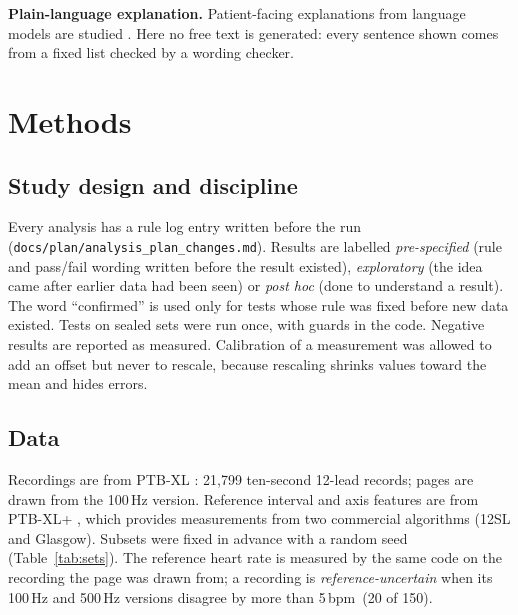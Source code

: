 \documentclass[11pt,a4paper]{article}
\newcommand{\bpm}{\,bpm}
\begin{document}
\textbf{Plain-language explanation.} Patient-facing explanations from language models are studied \citep{ref33}. Here no free text is generated: every sentence shown comes from a fixed list checked by a wording checker.

\section{Methods}

\subsection{Study design and discipline}
Every analysis has a rule log entry written before the run (\texttt{docs/plan/analysis\_plan\_changes.md}). Results are labelled \emph{pre-specified} (rule and pass/fail wording written before the result existed), \emph{exploratory} (the idea came after earlier data had been seen) or \emph{post hoc} (done to understand a result). The word ``confirmed'' is used only for tests whose rule was fixed before new data existed. Tests on sealed sets were run once, with guards in the code. Negative results are reported as measured. Calibration of a measurement was allowed to add an offset but never to rescale, because rescaling shrinks values toward the mean and hides errors.

\subsection{Data}
Recordings are from PTB-XL \citep{ref45}: 21,799 ten-second 12-lead records; pages are drawn from the 100\,Hz version. Reference interval and axis features are from PTB-XL+ \citep{ref46}, which provides measurements from two commercial algorithms (12SL and Glasgow). Subsets were fixed in advance with a random seed (Table~\ref{tab:sets}). The reference heart rate is measured by the same code on the recording the page was drawn from; a recording is \emph{reference-uncertain} when its 100\,Hz and 500\,Hz versions disagree by more than 5\bpm\ (20 of 150).
\end{document}

